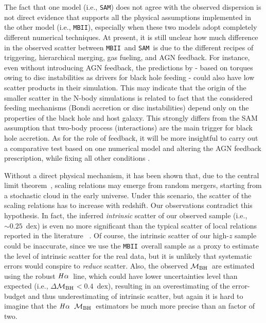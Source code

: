 \documentclass[twocolumn,trackchanges]{aastex63}
\newcommand{\mbh}{$\mathcal M_{\rm BH}$}
\newcommand{\halpha}{${\it H}\alpha$}
\newcommand{\sam}{\texttt{SAM}}
\newcommand{\mbii}{\texttt{MBII}}
\newcommand{\pink}[1]{{{#1}}}
\begin{document}
\pink{The fact that one model (i.e., \sam) does not agree with the observed dispersion is not direct evidence that supports all the physical assumptions implemented in the other model (i.e., \mbii), especially when these two models adopt completely different numerical techniques. At present, it is still unclear how much difference in the observed scatter between \mbii\ and \sam\ is due to the different recipes of triggering, hierarchical merging, gas fueling, and AGN feedback. For instance, even without introducing AGN feedback, the predictions by \citet{2017MNRAS.464.2840A}- based on torques owing to disc instabilities as 
 drivers for black hole feeding - could also have low scatter products in their simulation.}
This may indicate that the origin of the smaller scatter in the N-body simulations is related to fact that the considered feeding mechanisms (Bondi accretion or disc instabilities) depend only on the properties of the black hole and host galaxy. This strongly differs from the SAM assumption that two-body process (interactions) are the main trigger for black hole accretion. As for the role of feedback, \pink{it will be more insightful to carry out a comparative test based on one numerical model and altering the AGN feedback prescription, while fixing all other conditions \citep[see][]{Hopkins2009}.
}

Without a direct physical mechanism, it has been shown that, due to the central limit theorem~\citep{Peng2007, Jahnke2011, Hirschmann2010}, scaling relations may emerge from random mergers, starting from a stochastic cloud in the early universe. Under this scenario, the scatter of the scaling relations has to increase with redshift. Our observations contradict this hypothesis. \pink{In fact, the inferred {\it intrinsic} scatter of our observed sample (i.e., $\sim0.25$~dex) is even no more significant than the typical scatter of local relations reported in the literature ~\citep[][i.e., $\gtrsim0.35$~dex]{Kormendy13, Gul++09, Reines2015}.} Of course, the intrinsic scatter of our high-$z$ sample could be inaccurate, since we use the \mbii\ overall sample as a proxy to estimate the level of intrinsic scatter for the real data, but it is unlikely that systematic errors would conspire to {\it reduce} scatter.
Also, the observed \mbh\ are estimated using the robust \halpha\ line, which could have lower uncertainties level than expected (i.e., $\Delta$\mbh$<0.4$~dex), resulting in an overestimating of the error-budget and thus underestimating of intrinsic scatter, but again it is hard to imagine that the \halpha\ \mbh\ estimators be much more precise than an factor of two.
\end{document}
